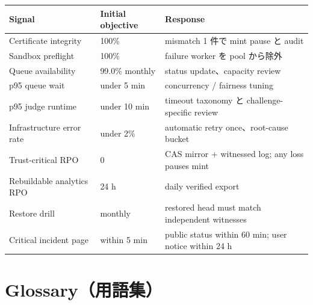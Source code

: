 \documentclass[a4paper,11pt]{ltjsarticle}
\begin{document}
\begin{tabularx}{0.96\linewidth}{L{55mm}L{32mm}Y}
\toprule
\textbf{Signal} & \textbf{Initial objective} & \textbf{Response} \\
\midrule
Certificate integrity & 100\% & mismatch 1 件で mint pause と audit \\
Sandbox preflight & 100\% & failure worker を pool から除外 \\
Queue availability & 99.0\% monthly & status update、capacity review \\
p95 queue wait & under 5 min & concurrency / fairness tuning \\
p95 judge runtime & under 10 min & timeout taxonomy と challenge-specific review \\
Infrastructure error rate & under 2\% & automatic retry once、root-cause bucket \\
Trust-critical RPO & 0 & CAS mirror + witnessed log; any loss pauses mint \\
Rebuildable analytics RPO & 24 h & daily verified export \\
Restore drill & monthly & restored head must match independent witnesses \\
Critical incident page & within 5 min & public status within 60 min; user notice within 24 h \\
\bottomrule
\end{tabularx}

\section{Glossary（用語集）}
\end{document}
